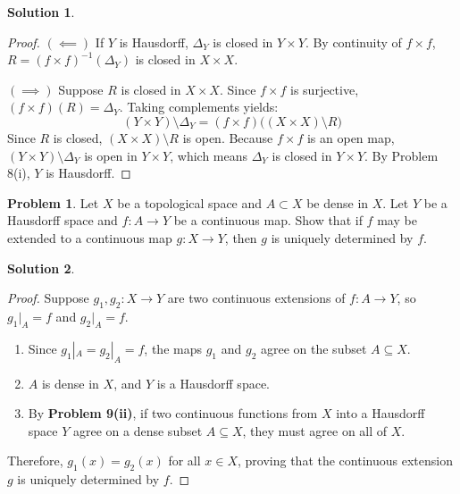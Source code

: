 \documentclass[11pt, a4paper]{article}
\theoremstyle{definition}
\newtheorem{problem}{Problem}
\newtheorem*{solution}{Solution}
\begin{document}
\begin{solution}
\begin{proof}
\smallskip
$(\impliedby)$ If $Y$ is Hausdorff, $\Delta_Y$ is closed in $Y \times Y$. By continuity of $f \times f$, $R = (f \times f)^{-1}(\Delta_Y)$ is closed in $X \times X$.

\smallskip
$(\implies)$ Suppose $R$ is closed in $X \times X$.
Since $f \times f$ is surjective, $(f \times f)(R) = \Delta_Y$. Taking complements yields:
\[
(Y \times Y) \setminus \Delta_Y = (f \times f)\big( (X \times X) \setminus R \big)
\]
Since $R$ is closed, $(X \times X) \setminus R$ is open. Because $f \times f$ is an open map, $(Y \times Y) \setminus \Delta_Y$ is open in $Y \times Y$, which means $\Delta_Y$ is closed in $Y \times Y$. By Problem 8(i), $Y$ is Hausdorff.
\end{proof}
\end{solution}

\vspace{1em}

\begin{problem}
Let $X$ be a topological space and $A \subset X$ be dense in $X$. Let $Y$ be a Hausdorff space and $f : A \to Y$ be a continuous map. Show that if $f$ may be extended to a continuous map $g : X \to Y$, then $g$ is uniquely determined by $f$.
\end{problem}

\begin{solution}
\begin{proof}
Suppose $g_1, g_2 : X \to Y$ are two continuous extensions of $f : A \to Y$, so $g_1|_A = f$ and $g_2|_A = f$.

\begin{enumerate}[label=\arabic*.]
    \item Since $g_1|_A = g_2|_A = f$, the maps $g_1$ and $g_2$ agree on the subset $A \subseteq X$.
    \item $A$ is dense in $X$, and $Y$ is a Hausdorff space.
    \item By \textbf{Problem 9(ii)}, if two continuous functions from $X$ into a Hausdorff space $Y$ agree on a dense subset $A \subseteq X$, they must agree on all of $X$.
\end{enumerate}
Therefore, $g_1(x) = g_2(x)$ for all $x \in X$, proving that the continuous extension $g$ is uniquely determined by $f$.
\end{proof}
\end{solution}
\end{document}
